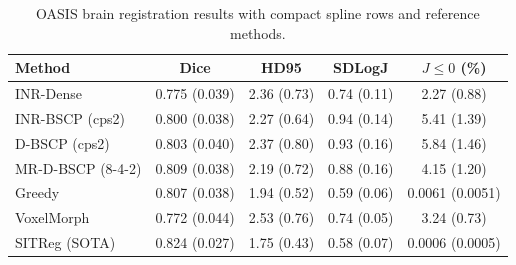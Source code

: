 \begin{table}[t]
\centering
\caption{OASIS brain registration results with compact spline rows and reference methods.}
\label{tab:oasis20-publication-main-with-references}
\begin{tabular}{lcccc}
\toprule
Method & Dice & HD95 & SDLogJ & $J\leq 0$ (\%) \\
\midrule
INR-Dense & 0.775 (0.039) & 2.36 (0.73) & 0.74 (0.11) & 2.27 (0.88) \\
INR-BSCP (cps2) & 0.800 (0.038) & 2.27 (0.64) & 0.94 (0.14) & 5.41 (1.39) \\
D-BSCP (cps2) & 0.803 (0.040) & 2.37 (0.80) & 0.93 (0.16) & 5.84 (1.46) \\
MR-D-BSCP (8-4-2) & 0.809 (0.038) & 2.19 (0.72) & 0.88 (0.16) & 4.15 (1.20) \\
Greedy & 0.807 (0.038) & 1.94 (0.52) & 0.59 (0.06) & 0.0061 (0.0051) \\
VoxelMorph & 0.772 (0.044) & 2.53 (0.76) & 0.74 (0.05) & 3.24 (0.73) \\
SITReg (SOTA) & 0.824 (0.027) & 1.75 (0.43) & 0.58 (0.07) & 0.0006 (0.0005) \\
\bottomrule
\end{tabular}
\end{table}
